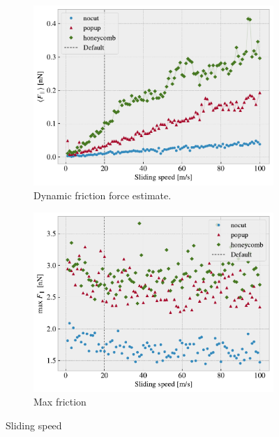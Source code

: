 \begin{figure}[H]
  \centering
  \begin{subfigure}[t]{0.49\textwidth}
      \centering
      \includegraphics[width=\textwidth]{figures/baseline/variables_vel_mean_fixmove.pdf}
      \caption{Dynamic friction force estimate.}
      \label{fig:var_vel_mean}
  \end{subfigure}
  \hfill
  \begin{subfigure}[t]{0.49\textwidth}
      \centering
      \includegraphics[width=\textwidth]{figures/baseline/variables_vel_max_fixmove.pdf}
      \caption{Max friction}
      \label{fig:var_vel_max}
  \end{subfigure}
  \hfill
     \caption{Sliding speed}
     \label{fig:var_vel}
\end{figure}



